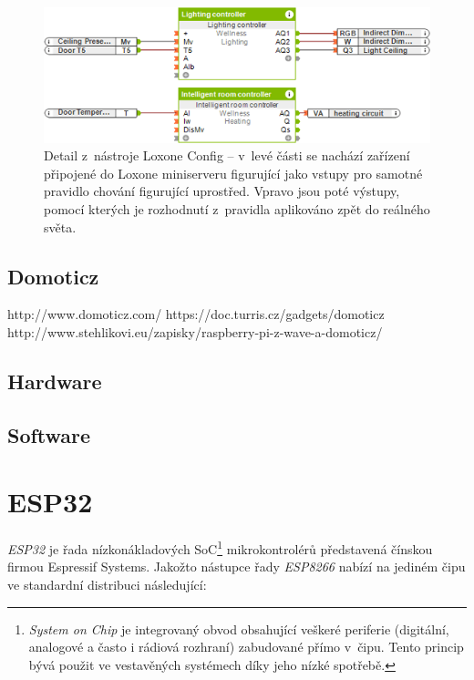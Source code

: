 \begin{figure}%
    \centering
    \includegraphics[width=\textwidth]{figures/iot-loxone-config.png}
    \caption{Detail z~nástroje Loxone Config -- v~levé části se nachází zařízení připojené do Loxone miniserveru
    figurující jako vstupy pro samotné pravidlo chování figurující uprostřed. %
    Vpravo jsou poté výstupy, pomocí kterých je rozhodnutí z~pravidla aplikováno zpět do reálného světa.}
    \label{fig:iot-loxone-config}
\end{figure}

\subsection{Domoticz}\label{subsec:domoticz}
http://www.domoticz.com/
https://doc.turris.cz/gadgets/domoticz
http://www.stehlikovi.eu/zapisky/raspberry-pi-z-wave-a-domoticz/

\subsection{Hardware}

\subsection{Software}

\section{ESP32}\label{sec:esp32}
\textit{ESP32} je řada nízkonákladových SoC\footnote{\textit{System on Chip} je integrovaný obvod obsahující veškeré
periferie (digitální, analogové a často i rádiová rozhraní) zabudované přímo v~čipu.
Tento princip bývá použit ve vestavěných systémech díky jeho nízké spotřebě.} mikrokontrolérů představená čínskou
firmou Espressif Systems.
Jakožto nástupce řady \textit{ESP8266} nabízí na jediném čipu ve standardní distribuci následující\cite{ESP32Datasheet}:


